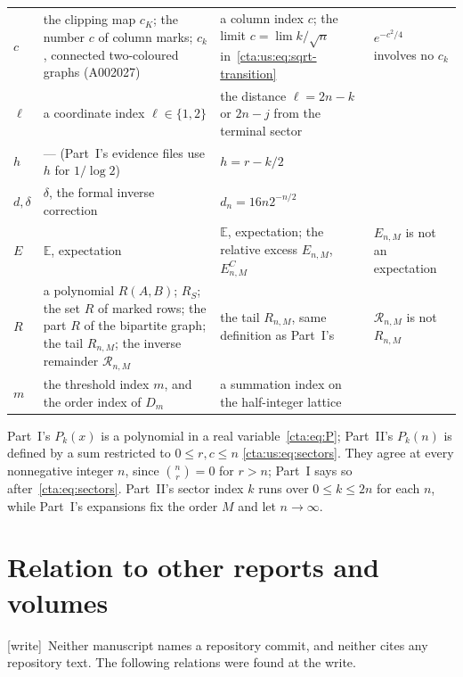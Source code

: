 \documentclass[11pt]{article}
\theoremstyle{definition}
\theoremstyle{remark}
\newcommand{\E}{\mathbb E}
\newcommand{\Rinv}{\mathcal R}
\newcommand{\wtag}{\textup{[write]}}
\begin{document}
\begin{small}
\begin{longtable}{@{}p{}p{}p{}p{}@{}}
$c$ & the clipping map $c_K$; the number $c$ of column marks; $c_k$, connected two-coloured graphs (A002027) & a column index $c$; the limit $c=\lim k/\sqrt n$ in~\eqref{cta:us:eq:sqrt-transition} & $e^{-c^2/4}$ involves no $c_k$\\
$\ell$ & a coordinate index $\ell\in\{1,2\}$ & the distance $\ell=2n-k$ or $2n-j$ from the terminal sector & \\
$h$ & --- (Part~I's evidence files use $h$ for $1/\log2$) & $h=r-k/2$ & \\
$d,\delta$ & $\delta$, the formal inverse correction & $d_n=16n2^{-n/2}$ & \\
$E$ & $\E$, expectation & $\E$, expectation; the relative excess $E_{n,M}$, $E^C_{n,M}$ & $E_{n,M}$ is not an expectation\\
$R$ & a polynomial $R(A,B)$; $R_S$; the set $R$ of marked rows; the part $R$ of the bipartite graph; the tail $R_{n,M}$; the inverse remainder $\Rinv_{n,M}$ & the tail $R_{n,M}$, same definition as Part~I's & $\Rinv_{n,M}$ is not $R_{n,M}$\\
$m$ & the threshold index $m$, and the order index of $D_m$ & a summation index on the half-integer lattice & \\
\bottomrule
\end{longtable}
\end{small}

Part~I's $P_k(x)$ is a polynomial in a real variable~\eqref{cta:eq:P};
Part~II's $P_k(n)$ is defined by a sum restricted to $0\le r,c\le n$
\eqref{cta:us:eq:sectors}. They agree at every nonnegative integer $n$,
since $\binom nr=0$ for $r>n$; Part~I says so after~\eqref{cta:eq:sectors}.
Part~II's sector index $k$ runs over $0\le k\le2n$ for each $n$, while
Part~I's expansions fix the order $M$ and let $n\to\infty$.

\section{Relation to other reports and volumes}\label{cta:sec:relation}

\wtag\ Neither manuscript names a repository commit, and neither cites any
repository text. The following relations were found at the write.
\end{document}
